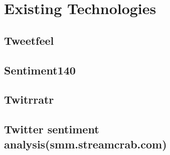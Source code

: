 \section{Existing Technologies}

	\subsection{Tweetfeel}
	\subsection{Sentiment140}
	\subsection{Twitrratr}
	\subsection{Twitter sentiment analysis(smm.streamcrab.com)}